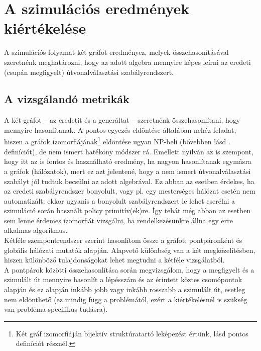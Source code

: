   \section{A szimulációs eredmények kiértékelése}
  A szimulációs folyamat két gráfot eredményez, melyek összehasonításával szeretnénk meghatározni, hogy az adott algebra mennyire képes leírni az eredeti (csupán megfigyelt) útvonalválasztási szabályrendszert.

    \subsection{A vizsgálandó metrikák}\label{metrikak}
    A két gráfot -- az eredetit és a generáltat -- szeretnénk összehasonlítani, hogy mennyire hasonlítanak. A pontos egyezés eldöntése általában nehéz feladat, hiszen a gráfok izomorfiájának\footnote{Két gráf izomorfiáján bijektív struktúratartó leképezést értünk, lásd pontos definíciót  résznél.} eldöntése ugyan NP-beli (bővebben lásd . definíciót), de nem ismert hatékony módszer rá. Emellett nyilván az is szempont, hogy itt az is fontos és használható eredmény, ha nagyon hasonlítanak egymásra a gráfok (hálózatok), mert ez azt jelentené, hogy a nem ismert útvonalválasztási szabályt jól tudtuk becsülni az adott algebrával. Ez abban az esetben érdekes, ha az eredeti szabályrendszer bonyolult, vagy pl. egy mesterséges hálózat esetén nem automatizált: ekkor ugyanis a bonyolult szabályrendszert le lehet cserélni a szimuláció során használt policy primitív(ek)re. Így tehát még abban az esetben sem lenne érdemes izomorfiát vizsgálni, ha rendelkezésünkre állna egy erre alkalmas algoritmus.\\

    Kétféle szempontrendszer szerint hasonlítom össze a gráfot: pontpáronként és globális hálózati mutatók alapján. Alapvető különbség van a két megközelítésben, hiszen különböző tulajdonságokat lehet megtudni a kétféle vizsgálatból.\\

    A pontpárok közötti összehasonlítása során megvizsgálom, hogy a megfigyelt és a szimulált út mennyire hasonlít a lépésszám és az érintett köztes csomópontok alapján és ez alapján inkább jobb vagy inkább rosszabb a szimulált út, esetleg nem eldönthető (ez mindig függ a problémától, ezért a kiértékelésnél is szükség van probléma-specifikus tudásra).\\

